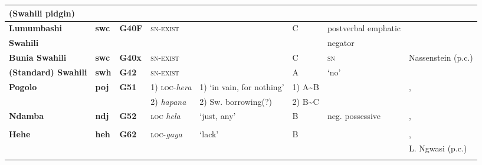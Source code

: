 \documentclass[output=paper]{langsci/langscibook}
\begin{document}
\begin{sidewaystable}[p]
\begin{scriptsize}
\begin{tabularx}{\textwidth}{llllllll}
\textbf{(Swahili pidgin)}\\\midrule
\textbf{Lumumbashi}&\textbf{swc}	&\textbf{G40F} 	&\textsc{sn-exist}&\textendash								&C 		& postverbal emphatic								&\citet{Schicho1992}\\
\textbf{Swahili}	&				&				&				&										&		&negator\\\midrule
\textbf{Bunia Swahili}&\textbf{swc}	&\textbf{G40x}	&\textsc{sn-exist}&\textendash								&C 		&\textsc{sn}										&Nassenstein (p.c.)\\\midrule
\textbf{(Standard) Swahili}&\textbf{swh}&\textbf{G42}&\textsc{sn-exist}&\textendash							&A{}	&`no' 											&\citet{Marten2013}\\\midrule
\textbf{Pogolo}	&\textbf{poj}	&\textbf{G51}	&1) \textsc{loc}-\textit{hera}&1) `in vain, for nothing'		&1) A{\textasciitilde}B&									&\citet{Nurse2007},\\
				&				&				&2) \textit{hapana}&2) Sw. borrowing(?)					&2) B{\textasciitilde}C&									&\citet{Hendle1907}\\\midrule
\textbf{Ndamba} &\textbf{ndj}		&\textbf{G52} 	&\textsc{loc} \textit{hela}&`just, any'						&B{}	&neg. possessive 									&\citet{Novotna2005},\\
				&				&				&				&										&		&												&\citet{EdelstenLijongwa2010}\\\midrule
\textbf{Hehe}	&\textbf{heh}	&\textbf{G62}	&\textsc{loc}-\textit{gaya}&`lack'							&B{}	&												&\citet{Velten1899},\\
				&				&				&				&										&		&												&L. Ngwasi (p.c.)\\
\lspbottomrule
\end{tabularx}\end{scriptsize}
\end{sidewaystable}
\end{document}
